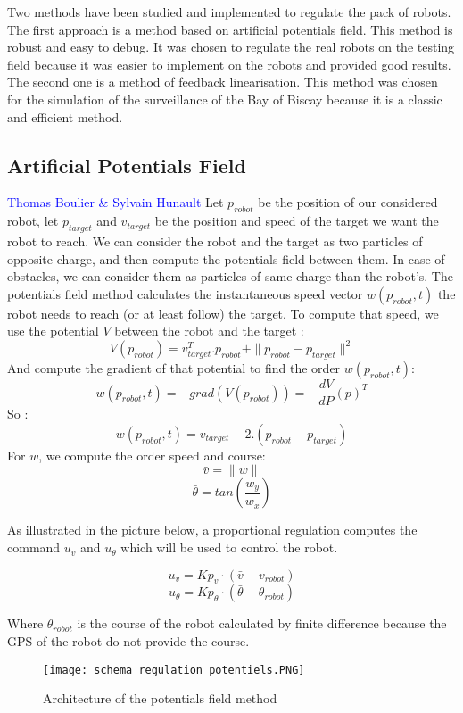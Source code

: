 Two methods have been studied and implemented to regulate the pack of robots. The first approach is a method based on artificial potentials field. This method is robust and easy to debug. It was chosen to regulate the real robots on the testing field because it was easier to implement on the robots and provided good results. The second one is a method of feedback linearisation. This method was chosen for the simulation of the surveillance of the Bay of Biscay because it is a classic and efficient method.

\subsection{Artificial Potentials Field}
\vspace*{0.5 cm}
	\textcolor{blue} {Thomas Boulier & Sylvain Hunault}
\vspace*{0.5cm}
Let $p_{robot}$ be the position of our considered robot, let $p_{target}$ and $v_{target}$ be the position and speed of the target we want the robot to reach.
We can consider the robot and the target as two particles of opposite charge, and then compute the potentials field between them. In case of obstacles, we can consider them as particles of same charge than the robot's.
The potentials field method calculates the instantaneous speed vector $w(p_{robot},t)$ the robot needs to reach (or at least follow) the target. To compute that speed, we use the potential $V$ between the robot and the target :\\
\[ V(p_{robot}) = v^T_{target}. p_{robot} + \|p_{robot}-p_{target}\|^2 \]
And compute the gradient of that potential to find the order $w(p_{robot},t)$:
\[w(p_{robot},t) = -grad(V(p_{robot})) = -\frac{dV}{dP}(p)^T\]
So :
\[w(p_{robot},t) = v_{target}-2.(p_{robot}-p_{target})\]
For $w$, we compute the order speed and course:
\[\bar{v} = \|w\| \]
\[\bar{\theta} = tan(\frac{w_y}{w_x})\]

As illustrated in the picture below, a proportional regulation computes the command $u_v$ and $u_{\theta}$ which will be used to control the robot.

\[ u_v = Kp_v \cdot (\bar{v}-v_{robot}) \]
\[ u_{\theta} = Kp_{\theta} \cdot (\bar{\theta}-\theta_{robot}) \]

Where $\theta_{robot}$ is the course of the robot calculated by finite difference because the GPS of the robot do not provide the course.

\begin{figure}[H]
   \caption{\label{schema_regulation_potentiels} Architecture of the potentials field method}
   \texttt{[image: schema\_regulation\_potentiels.PNG]}
\end{figure}

